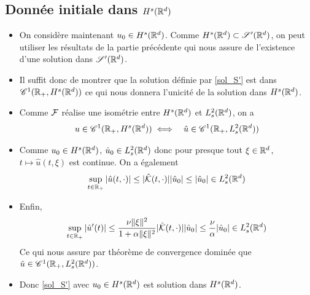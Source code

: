 \subsection{Donnée initiale dans \texorpdfstring{$H^s(\mathbb{R}^d)$}{Hs(Rd)}}

\begin{frame}
\begin{itemize}
\item On considère maintenant $u_0 \in H^s(\mathbb{R}^d)$. Comme 
$H^s(\mathbb{R}^d) \subset \mathscr{S}'(\mathbb{R}^d)$, on peut utiliser les 
résultats de la partie précédente qui nous assure de l'existence 
d'une solution dans $\mathscr{S}'(\mathbb{R}^d)$. 
\item Il suffit donc de montrer 
que la solution définie par \eqref{sol_S'} est dans 
$\mathscr{C}^1(\mathbb{R}_+,H^s(\mathbb{R}^d))$ ce qui nous donnera l'unicité de 
la solution dans $H^s(\mathbb{R}^d)$.
    \item Comme $\mathcal{F}$ réalise une isométrie entre $H^s(\mathbb{R}^d)$ et 
$L^2_s(\mathbb{R}^d)$, on a
\begin{eqnarray*}
    u \in \mathscr{C}^1(\mathbb{R}_+,H^s(\mathbb{R}^d)) &\iff& \hat{u} \in \mathscr{C}^1(\mathbb{R}_+, L^2_s(\mathbb{R}^d))
\end{eqnarray*} 
\item Comme $u_0 \in H^s(\mathbb{R}^d)$, $\hat{u}_0 \in L_s^2(\mathbb{R}^d)$ donc pour presque tout $\xi \in \mathbb{R}^d$, $t \mapsto \hat{u}(t,\xi)$ est continue. On a également
\begin{equation*}
    \sup_{t \in \mathbb{R}_+}|\hat{u}(t,\cdot)| \leq |\hat{\mathcal{K}}(t,\cdot)||\hat{u}_0| \leq |\hat{u}_0| \in L^2_s(\mathbb{R}^d)
\end{equation*} 
\item Enfin, 
\begin{equation*}
    \sup_{t \in \mathbb{R}_+} |\hat{u}'(t)| \leq \frac{\nu\|\xi\|^2}{1+\alpha\|\xi\|^2}|\hat{\mathcal{K}}(t,\cdot)||\hat{u}_0| \leq \frac{\nu}{\alpha}|\hat{u}_0| \in L^2_s(\mathbb{R}^d)
\end{equation*}
Ce qui nous assure par théorème de convergence dominée que $\hat{u} \in \mathscr{C}^1(\mathbb{R}_+,L^2_s(\mathbb{R}^d))$.
\item Donc \eqref{sol_S'} avec $u_0 \in H^s(\mathbb{R}^d)$ est solution dans $H^s(\mathbb{R}^d)$.
\end{itemize}
\end{frame}

